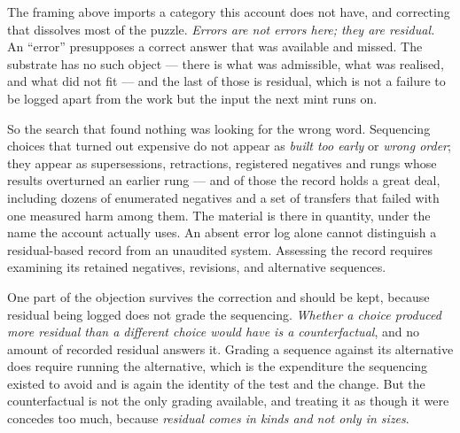 \documentclass[11pt,a4paper]{article}
\begin{document}
The framing above imports a category this account does not have, and correcting that dissolves most of
the puzzle. \emph{Errors are not errors here; they are residual.} An ``error'' presupposes a correct
answer that was available and missed. The substrate has no such object --- there is what was admissible,
what was realised, and what did not fit --- and the last of those is residual, which is not a failure to
be logged apart from the work but the input the next mint runs on.

So the search that found nothing was looking for the wrong word. Sequencing choices that turned out
expensive do not appear as \emph{built too early} or \emph{wrong order}; they appear as supersessions,
retractions, registered negatives and rungs whose results overturned an earlier rung --- and of those
the record holds a great deal, including dozens of enumerated negatives and a set of transfers that
failed with one measured harm among them. The material is there in quantity, under the name the account
actually uses. An absent error log alone cannot distinguish a residual-based record from an unaudited system. Assessing the record requires examining its retained negatives, revisions, and alternative sequences.

One part of the objection survives the correction and should be kept, because residual being logged
does not grade the sequencing. \emph{Whether a choice produced more residual than a different choice
would have is a counterfactual}, and no amount of recorded residual answers it. Grading a sequence against its alternative does require
running the alternative, which is the expenditure the sequencing existed to avoid and is again the
identity of the test and the change. But the counterfactual is not the only grading available, and
treating it as though it were concedes too much, because \emph{residual comes in kinds and not only in
sizes}.
\end{document}
